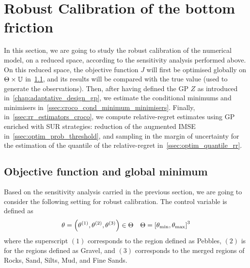 \documentclass[../../Main_ManuscritThese.tex]{subfiles}
\newcommand{\zob}{z_b}
\begin{document}
\section{Robust Calibration of the bottom friction}
\label{sec:robust_calibration}
In this section, we are going to study the robust calibration of the
numerical model, on a reduced space, according to the sensitivity
analysis performed above.  On this reduced space, the objective
function $J$ will first be optimised globally on
$\Theta \times \mathbb{U}$ in~\cref{ssec:glob_mini}, and its results
will be compared with the true value (used to generate the
observations). Then, after having defined the GP $Z$ as introduced
in~\cref{chap:adaptative_design_gp}, we estimate the conditional
minimums and minimisers
in~\cref{ssec:croco_cond_minimum_minimisers}. Finally,
in~\cref{ssec:rr_estimators_croco}, we compute relative-regret
estimates using GP enriched with SUR strategies: reduction of the
augmented IMSE in~\cref{ssec:optim_prob_threshold}, and sampling in
the margin of uncertainty for the estimation of the quantile of the
relative-regret in~\cref{ssec:optim_quantile_rr}.

\subsection{Objective function and global minimum}
\label{ssec:glob_mini}
Based on the sensitivity analysis carried in the previous section, we
are going to consider the following setting for robust calibration.
The control variable is defined as
\begin{equation}
  \kk=\left(\kk^{(1)},\kk^{(2)},\kk^{(3)}\right) \in \Kspace %
  \quad \Kspace = \interval{\kk_{\min}}{\kk_{\max}}^3
\end{equation}
 where the superscript $(1)$ corresponds to the region
defined as Pebbles, $(2)$ is for the regions defined as Gravel, and
$(3)$ corresponds to the merged regions of Rocks, Sand, Silts, Mud,
and Fine Sands.

\end{document}
